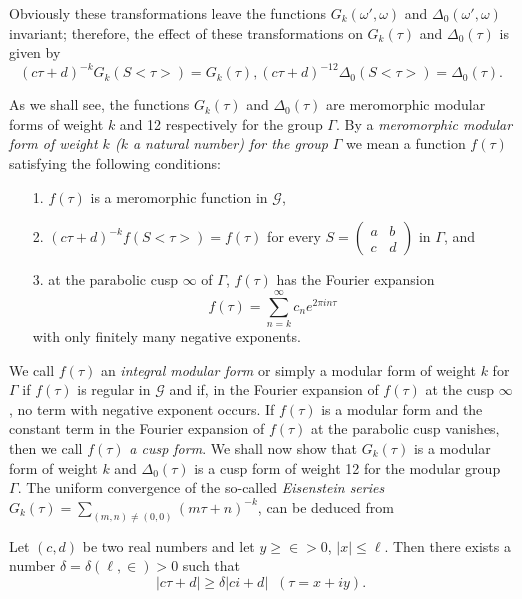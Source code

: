 Obviously these transformations leave the functions $G_k(\omega',
\omega)$ and $\Delta_0(\omega',\omega)$ invariant; therefore, the
effect of these transformations on $G_k(\tau)$ and $\Delta_0(\tau)$ is
given by 
$$
(c\tau+d)^{-k} G_k(S<\tau>) = G_k (\tau), (c\tau+d)^{-12} \Delta_0
(S<\tau>) = \Delta_0(\tau).
$$

As we shall see, the functions $G_k(\tau)$ and $\Delta_0(\tau)$ are
meromorphic modular forms of weight $k$ and 12 respectively for the
group $\Gamma$. By a \textit{meromorphic modular form of weight $k$
  ($k$ a natural number) for the group} $\Gamma$ we mean a function
$f(\tau)$ satisfying the following conditions:
\begin{itemize}
\item[1.] $f(\tau)$ is a meromorphic function in $\mathscr{G}$,

\item[2.] $(c\tau+d)^{-k} f(S<\tau>) = f(\tau)$ for every $S=
  \left(\begin{smallmatrix} a&b\\c&d \end{smallmatrix}\right)$ in
  $\Gamma$, and 

\item[3.] at the parabolic cusp $\infty$ of $\Gamma$, $f(\tau)$ has
  the Fourier expansion
$$
f(\tau) = \sum^{\infty}_{n=k} c_n e^{2\pi i n\tau}
$$
with only finitely many negative exponents.
\end{itemize}

We call $f(\tau)$ an \textit{integral modular form} or simply a
modular form of weight $k$ for $\Gamma$ if $f(\tau)$ is regular in
$\mathscr{G}$ and if, in the Fourier expansion of $f(\tau)$ at the
cusp $\infty$, no term with negative exponent occurs. If $f(\tau)$ is
a modular form \pageoriginale and the constant term in the Fourier
expansion of $f(\tau)$ at the parabolic cusp vanishes, then we call
$f(\tau)$ \textit{a cusp form}. We shall now show that $G_k(\tau)$ is
a modular form of weight $k$ and $\Delta_0(\tau)$ is a cusp form of
weight 12 for the modular group $\Gamma$. The uniform convergence of
the so-called \textit{Eisenstein series} $G_k(\tau)=\sum_{(m,n)\neq
  (0,0)}(m\tau+n)^{-k}$, can be deduced from

\begin{lem}\label{chap2:lem3}
Let $(c,d)$ be two real numbers and let $y\geq \in > 0$,
$|x|\leq \ell$. Then there exists a number $\delta=\delta(\ell,
\in) >0$ such that 
$$
|c\tau+d| \geq \delta | ci +d| \;\; (\tau=x+iy).
$$
\end{lem}

